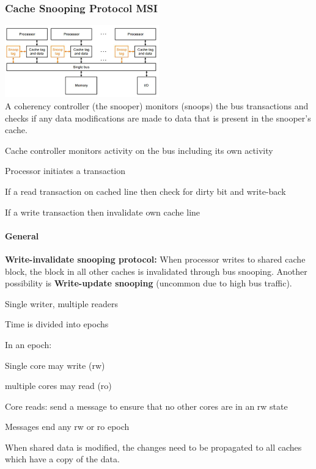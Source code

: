 		\subsubsection{Cache Snooping Protocol MSI }
			\begin{multicols}{2}
				\includegraphics[width=0.5\textwidth]{./pictures/cache_snooping.png} \\
				A coherency controller (the snooper) monitors (snoops) the bus transactions and checks if any data modifications are made to data that is present in the snooper's cache. 
				\begin{compactitem}
					\item Cache controller monitors activity on the bus including its own activity
					\item Processor initiates a transaction
					\item If a read transaction on cached line then check for dirty bit and write-back
					\item If a write transaction then invalidate own cache line
				\end{compactitem}
			\end{multicols}
			
			\paragraph{General}
			\begin{compactitem}
			  	\item \textbf{Write-invalidate snooping protocol:} When processor writes to shared cache block, the block in all other caches is invalidated through bus snooping. Another possibility is \textbf{Write-update snooping} (uncommon due to high bus traffic). 
			  	\item Single writer, multiple readers
			  	\item Time is divided into epochs
			  	\item In an epoch:
			  		\begin{compactitem}
			  	  		\item Single core may write (rw)
			  	  		\item multiple cores may read (ro)
			  	 	\end{compactitem}
				\item Core reads: send a message to ensure that no other cores are in an rw state
				\item Messages end any rw or ro epoch
				\item When shared data is modified, the changes need to be propagated to all caches which have a copy of the data.
			\end{compactitem}
			
